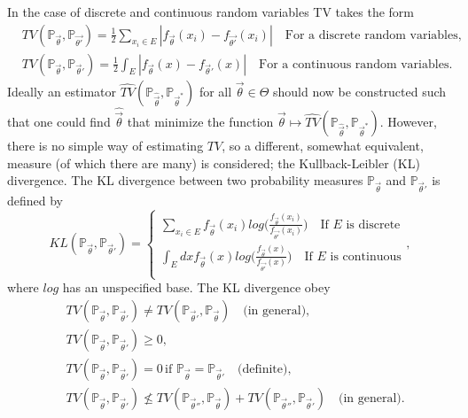 In the case of discrete and continuous random variables TV takes the form
\begin{equation}
	\begin{split}
		&TV(\mathbb{P}_{\vec{\theta}},\mathbb{P}_{\vec{\theta'}})=\frac{1}{2}\sum_{x_i\in E}|f_{\vec{\theta}}(x_i)-f_{\vec{\theta'}}(x_i)|\quad \text{For a discrete random variables},\\
		&TV(\mathbb{P}_{\vec{\theta}},\mathbb{P}_{\vec{\theta}'})=\frac{1}{2}\int_E|f_{\vec{\theta}}(x)-f_{\vec{\theta}'}(x)|\quad \text{For a continuous random variables}.
	\end{split}
\end{equation}
Ideally an estimator $\widehat{TV}(\mathbb{P}_{\hat{\vec{\theta}}},\mathbb{P}_{\vec{\theta}^*})$ for all $\vec{\theta}\in \Theta$ should now be constructed such that one could find $\hat{\vec{\theta}}$ that minimize the function $\vec{\theta}\mapsto \widehat{TV}(\mathbb{P}_{\hat{\vec{\theta}}},\mathbb{P}_{\vec{\theta}^*})$. However, there is no simple way of estimating $TV$, so a different, somewhat equivalent, measure (of which there are many) is considered; the Kullback-Leibler (KL) divergence. The KL divergence  between two probability measures $\mathbb{P}_{\vec{\theta}}$ and $\mathbb{P}_{\vec{\theta}'}$ is defined by
\begin{equation}
	KL(\mathbb{P}_{\vec{\theta}},\mathbb{P}_{\vec{\theta}'})=\begin{cases}
		\sum_{x_i\in E}f_{\vec{\theta}}(x_i)log\bigg(\frac{f_{\vec{\theta}}(x_i)}{f_{\vec{\theta'}}(x_i)}\bigg) \quad \text{If $E$ is discrete}\\
		\int_Edx f_{\vec{\theta}}(x)log\bigg(\frac{f_{\vec{\theta}}(x)}{f_{\vec{\theta'}}(x)}\bigg) \quad \text{If $E$ is continuous}\\
	\end{cases},
\end{equation}
where $log$ has an unspecified base. The KL divergence obey
\begin{equation}
	\begin{split}
		&TV(\mathbb{P}_{\vec{\theta}},\mathbb{P}_{\vec{\theta}'})\neq TV(\mathbb{P}_{\vec{\theta}'},\mathbb{P}_{\vec{\theta}})\quad \text{(in general)},\\
		&TV(\mathbb{P}_{\vec{\theta}},\mathbb{P}_{\vec{\theta}'})\geq 0,\\
		&TV(\mathbb{P}_{\vec{\theta}},\mathbb{P}_{\vec{\theta}'})=0\,\text{if } \mathbb{P}_{\vec{\theta}}=\mathbb{P}_{\vec{\theta}'}\quad \text{(definite)} ,\\
		&TV(\mathbb{P}_{\vec{\theta}},\mathbb{P}_{\vec{\theta}'})\nleq  TV(\mathbb{P}_{\vec{\theta}''},\mathbb{P}_{\vec{\theta}})+TV(\mathbb{P}_{\vec{\theta}''},\mathbb{P}_{\vec{\theta}'})\quad \text{(in general)}.\\
	\end{split}
\end{equation}
